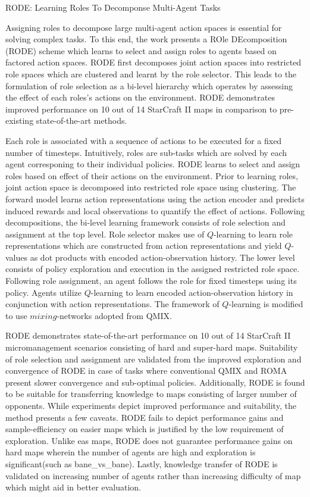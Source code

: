 \documentclass[11pt,letterpaper]{article}
\begin{document}
\begin{center}
  \large{RODE: Learning Roles To Decomponse Multi-Agent Tasks}
\end{center}

Assigning roles to decompose large multi-agent action spaces is essential for solving complex tasks. To this end, the work presents a ROle DEcomposition (RODE) scheme which learns to select and assign roles to agents based on factored action spaces. RODE first decomposes joint action spaces into restricted role spaces which are clustered and learnt by the role selector. This leads to the formulation of role selection as a bi-level hierarchy which operates by assessing the effect of each roles's actions on the environment. RODE demonstrates improved performance on 10 out of 14 StarCraft II maps in comparison to pre-existing state-of-the-art methods.  

Each role is associated with a sequence of actions to be executed for a fixed number of timesteps. Intuitively, roles are sub-tasks which are solved by each agent corresponing to their individual policies. RODE learns to select and assign roles based on effect of their actions on the environment. Prior to learning roles, joint action space is decomposed into restricted role space using clustering. The forward model learns action representations using the action encoder and predicts induced rewards and local observations to quantify the effect of actions. Following decompositions, the bi-level learning framework consists of role selection and assignment at the top level. Role selector makes use of $Q$-learning to learn role representations which are constructed from action representations and yield $Q$-values as dot products with encoded action-observation history. The lower level consists of policy exploration and execution in the assigned restricted role space. Following role assignment, an agent follows the role for fixed timesteps using its policy. Agents utilize $Q$-learning to learn encoded action-observation history in conjunction with action representations. The framework of $Q$-learning is modified to use $mixing$-networks adopted from QMIX.

RODE demonstrates state-of-the-art performance on 10 out of 14 StarCraft II micromanagement scenarios consisting of hard and super-hard maps. Suitability of role selection and assignment are validated from the improved exploration and convergence of RODE in case of tasks where conventional QMIX and ROMA present slower convergence and sub-optimal policies. Additionally, RODE is found to be suitable for transferring knowledge to maps consisting of larger number of opponents. While experiments depict improved performance and suitability, the method presents a few caveats. RODE fails to depict performance gains and sample-efficiency on easier maps which is justified by the low requirement of exploration. Unlike eas maps, RODE does not guarantee performance gains on hard maps wherein the number of agents are high and exploration is significant(such as bane\_vs\_bane). Lastly, knowledge transfer of RODE is validated on increasing number of agents rather than increasing difficulty of map which might aid in better evaluation.
\end{document}

